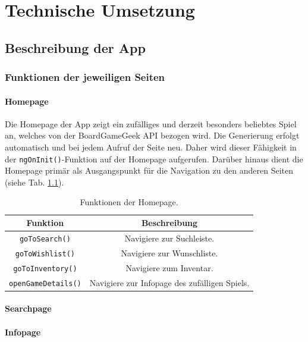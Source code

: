 \chapter{Technische Umsetzung}
\section{Beschreibung der App}
\subsection{Funktionen der jeweiligen Seiten}
\subsubsection{Homepage}
Die Homepage der App zeigt ein zufälliges und derzeit besonders beliebtes Spiel an, welches von der BoardGameGeek \ac{API} bezogen wird.
Die Generierung erfolgt automatisch und bei jedem Aufruf der Seite neu. Daher wird dieser Fähigkeit in der \texttt{ngOnInit()}-Funktion auf der Homepage aufgerufen.
Darüber hinaus dient die Homepage primär als Ausgangspunkt für die Navigation zu den anderen Seiten (siehe Tab. \ref{tab:homepage}).
\begin{table}[H]
    \centering
    \begin{tabular}{|c|c|}
        \hline
        \textbf{Funktion} & \textbf{Beschreibung} \\
        \hline
        \texttt{goToSearch()} & Navigiere zur Suchleiste. \\
        \texttt{goToWishlist()} & Navigiere zur Wunschliste. \\
        \texttt{goToInventory()} & Navigiere zum Inventar. \\
        \texttt{openGameDetails()} & Navigiere zur Infopage des zufälligen Spiels. \\
        \hline
    \end{tabular}
    \caption{Funktionen der Homepage.}
    \label{tab:homepage}
\end{table}

\subsubsection{Searchpage}
\subsubsection{Infopage}
